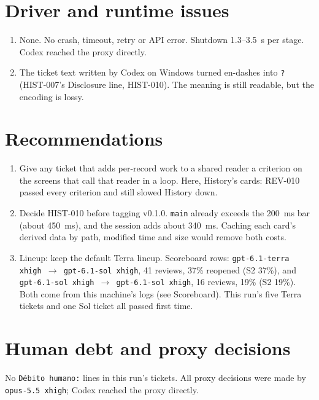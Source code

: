 \documentclass[11pt,a4paper]{article}
\begin{document}
\section*{Driver and runtime issues}

\begin{enumerate}
  \item None. No crash, timeout, retry or API error. Shutdown 1.3--3.5~s per stage. Codex reached
        the proxy directly.
  \item The ticket text written by Codex on Windows turned en-dashes into \texttt{?} (HIST-007's
        Disclosure line, HIST-010). The meaning is still readable, but the encoding is lossy.
\end{enumerate}

\section*{Recommendations}

\begin{enumerate}
  \item Give any ticket that adds per-record work to a shared reader a criterion on the screens
        that call that reader in a loop. Here, History's cards: REV-010 passed every
        criterion and still slowed History down.
  \item Decide HIST-010 before tagging v0.1.0. \texttt{main} already exceeds the 200~ms bar
        (about 450~ms), and the session adds about 340~ms. Caching each card's derived data by path,
        modified time and size would remove both costs.
  \item Lineup: keep the default Terra lineup. Scoreboard rows: \texttt{gpt-6.1-terra xhigh
        $\rightarrow$ gpt-6.1-sol xhigh}, 41 reviews, 37\% reopened (S2 37\%), and
        \texttt{gpt-6.1-sol xhigh $\rightarrow$ gpt-6.1-sol xhigh}, 16 reviews, 19\% (S2 19\%). Both
        come from this machine's logs (see Scoreboard). This run's five Terra tickets and one Sol
        ticket all passed first time.
\end{enumerate}

\section*{Human debt and proxy decisions}

No \texttt{Débito humano:} lines in this run's tickets. All proxy decisions were made by
\texttt{opus-5.5 xhigh}; Codex reached the proxy directly.
\end{document}
